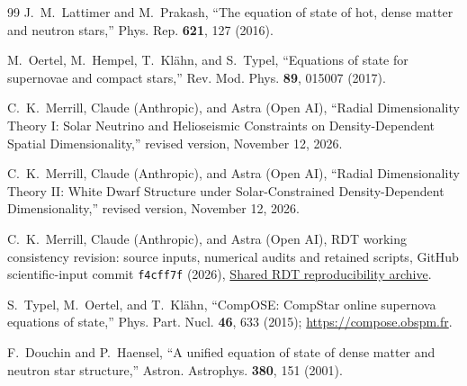 \documentclass[twocolumn,prd,superscriptaddress,nofootinbib]{revtex4-2}
\begin{document}
\begin{thebibliography}{99}
J.~M.~Lattimer and M.~Prakash, 
``The equation of state of hot, dense matter and neutron stars,''
Phys. Rep. \textbf{621}, 127 (2016).

M.~Oertel, M.~Hempel, T.~Kl\"{a}hn, and S.~Typel,
``Equations of state for supernovae and compact stars,''
Rev. Mod. Phys. \textbf{89}, 015007 (2017).

 C.~K.~Merrill, Claude (Anthropic), and Astra (Open AI),
``Radial Dimensionality Theory I: Solar Neutrino and Helioseismic Constraints on Density-Dependent Spatial Dimensionality,''
revised version, November 12, 2026.

 C.~K.~Merrill, Claude (Anthropic), and Astra (Open AI),
``Radial Dimensionality Theory II: White Dwarf Structure under Solar-Constrained Density-Dependent Dimensionality,''
revised version, November 12, 2026.

C.~K.~Merrill, Claude (Anthropic), and Astra (Open AI),
RDT working consistency revision: source inputs, numerical audits and
retained scripts, GitHub scientific-input commit \texttt{f4cff7f} (2026),
\href{https://github.com/chrismerrill1974/solarcore_code/tree/main/reproduction}{Shared RDT reproducibility archive}.

S.~Typel, M.~Oertel, and T.~Kl\"ahn,
``CompOSE: CompStar online supernova equations of state,''
Phys. Part. Nucl. \textbf{46}, 633 (2015); \url{https://compose.obspm.fr}.

F.~Douchin and P.~Haensel,
``A unified equation of state of dense matter and neutron star structure,''
Astron. Astrophys. \textbf{380}, 151 (2001).
\end{thebibliography}
\end{document}
